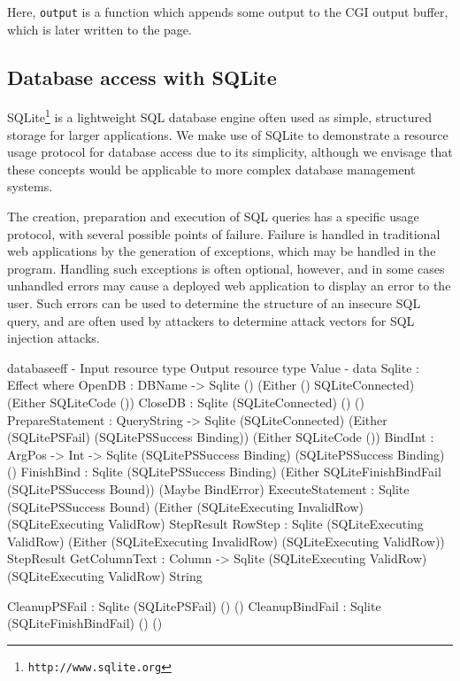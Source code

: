 Here, \texttt{output} is a function which appends some output to the CGI output buffer, which is later written to the page.

\subsection{Database access with SQLite}

SQLite\footnote{\texttt{http://www.sqlite.org}} is a lightweight SQL database
engine often used as simple, structured storage for larger applications. We
make use of SQLite to demonstrate a resource usage protocol for database access due to its simplicity, although we envisage that these
concepts would be applicable to more complex database management systems. 

The creation, preparation and execution of SQL queries has a specific usage
protocol, with several possible points of failure. Failure is handled in
traditional web applications by the generation of exceptions, which may be
handled in the program.  Handling such exceptions is often optional, however,
and in some cases unhandled errors may cause a deployed web application to
display an error to the user. Such errors can be used to determine the
structure of an insecure SQL query, and are often used by attackers to
determine attack vectors for SQL injection attacks.

\begin{SaveVerbatim}{databaseeff}
{-                           { Input resource type }    { Output resource type }             { Value }           -}
data Sqlite : Effect where
  OpenDB            : DBName -> 
                      Sqlite ()                         (Either () SQLiteConnected)          (Either SQLiteCode ())
  CloseDB           : Sqlite (SQLiteConnected)          ()                                   ()
  PrepareStatement  : QueryString -> 
                      Sqlite (SQLiteConnected)          (Either (SQLitePSFail) 
                                                          (SQLitePSSuccess Binding))         (Either SQLiteCode ())
  BindInt           : ArgPos -> Int -> 
                      Sqlite (SQLitePSSuccess Binding)  (SQLitePSSuccess Binding)            ()
  FinishBind        : Sqlite (SQLitePSSuccess Binding)  (Either SQLiteFinishBindFail
                                                          (SQLitePSSuccess Bound))           (Maybe BindError)
  ExecuteStatement  : Sqlite (SQLitePSSuccess Bound)    (Either (SQLiteExecuting InvalidRow)
                                                          (SQLiteExecuting ValidRow)         StepResult
  RowStep           : Sqlite (SQLiteExecuting ValidRow) (Either (SQLiteExecuting InvalidRow)
                                                          (SQLiteExecuting ValidRow))        StepResult
  GetColumnText     : Column -> 
                      Sqlite (SQLiteExecuting ValidRow) (SQLiteExecuting ValidRow)           String
                      
  CleanupPSFail     : Sqlite (SQLitePSFail)             ()                                   ()
  CleanupBindFail   : Sqlite (SQLiteFinishBindFail)     ()                                   ()

\end{SaveVerbatim}

